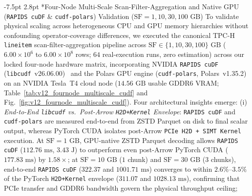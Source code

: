 \documentclass[10pt,a4paper]{article}
\makeatletter
\renewcommand\subsection{\@startsection{subsection}{2}{\z@}%
  {-7.5pt \@plus -2pt \@minus -1pt}%
  {2.8pt \@plus 1pt}%
  {\normalfont\normalsize\bfseries}}
\makeatother
\begin{document}
\subsection*{Four-Node Multi-Scale Scan-Filter-Aggregation and Native GPU (\texttt{RAPIDS cuDF} \& \texttt{cudf-polars}) Validation ($\text{SF}=1, 10, 30, 100\text{ GB}$)}
To validate physical scaling across heterogeneous CPU and GPU memory hierarchies without confounding operator-coverage differences, we executed the canonical TPC-H \texttt{lineitem} scan-filter-aggregation pipeline across $\text{SF} \in \{1, 10, 30, 100\}\text{ GB}$ ($6.00 \times 10^{6}$ to $6.00 \times 10^{8}$ rows; $64$ real-execution runs, zero estimation) across our locked four-node hardware matrix, incorporating NVIDIA \texttt{RAPIDS cuDF} (\texttt{libcudf}~v26.06.00)~\cite{rapids2024cudf} and the Polars GPU engine (\texttt{cudf-polars}, Polars~v1.35.2) on an NVIDIA Tesla~T4 cloud node ($14.56\text{ GB}$ usable GDDR6 VRAM; Table~\ref{tab:v12_fournode_multiscale_cudf} and Fig.~\ref{fig:v12_fournode_multiscale_cudf}). Four architectural insights emerge:
(i) \emph{End-to-End \texttt{libcudf} vs.\ Post-Arrow \texttt{H2D+Kernel} Envelope}: \texttt{RAPIDS cuDF} and \texttt{cudf-polars} are measured end-to-end from ZSTD Parquet on disk to final scalar output, whereas PyTorch CUDA isolates post-Arrow \texttt{PCIe H2D + SIMT Kernel} execution. At $\text{SF}=1\text{ GB}$, GPU-native ZSTD Parquet decoding allows \texttt{RAPIDS cuDF} ($112.76\text{ ms}$, $3.43\text{ J}$) to outperform even post-Arrow PyTorch CUDA ($177.83\text{ ms}$) by $1.58\times$; at $\text{SF}=10\text{ GB}$ ($1$ chunk) and $\text{SF}=30\text{ GB}$ ($3$ chunks), end-to-end \texttt{RAPIDS cuDF} ($322.37$ and $1001.71\text{ ms}$) converges to within $2.6\%\text{--}3.5\%$ of the PyTorch \texttt{H2D+Kernel} envelope ($311.07$ and $1028.13\text{ ms}$), confirming that PCIe transfer and GDDR6 bandwidth govern the physical throughput ceiling;
\end{document}
